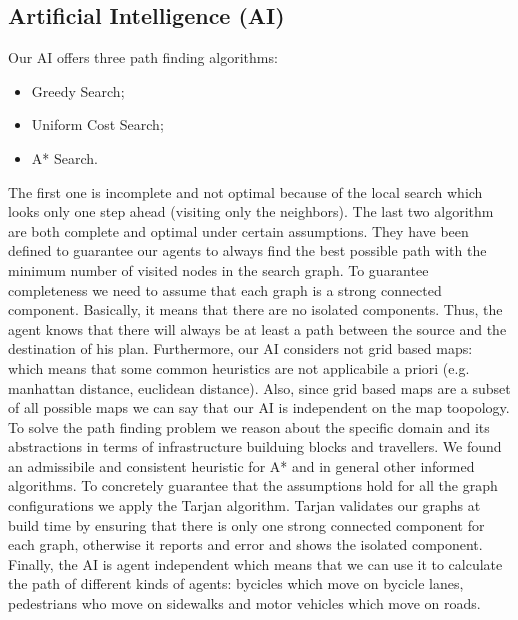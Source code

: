 \subsection{Artificial Intelligence (AI)}

Our AI offers three path finding algorithms:
\begin{itemize}
  \item Greedy Search;
  \item Uniform Cost Search;
  \item A* Search.
\end{itemize}

The first one is incomplete and not optimal because of the local search which looks only one step ahead (visiting
only the neighbors). The last two algorithm are both complete and optimal under certain assumptions. They have been defined
to guarantee our agents to always find the best possible path with the minimum number of visited nodes in the search graph.
To guarantee completeness we need to assume that each graph is a strong connected component. Basically, it means that there are no isolated components. Thus, the agent knows that there will always be at least a path between the source and the destination of his plan.
Furthermore, our AI considers not grid based maps: which means that some common heuristics are not applicabile a priori (e.g. manhattan distance, euclidean distance). Also, since grid based maps are a subset of all possible maps we can say that our AI is independent on the map toopology. To solve the path finding problem we reason about the specific domain and its abstractions in terms of infrastructure builduing blocks and travellers. We found an admissibile and consistent heuristic for A* and in general other informed algorithms. To concretely guarantee that the assumptions hold for all the graph configurations we apply the Tarjan
algorithm. Tarjan validates our graphs at build time by ensuring that there is only one strong connected component for each graph, otherwise it reports and error and shows the isolated component. Finally, the AI is agent independent which means that we can use it to calculate the path of different kinds of agents: bycicles which move on bycicle lanes, pedestrians who move on sidewalks and motor vehicles which move on roads.
